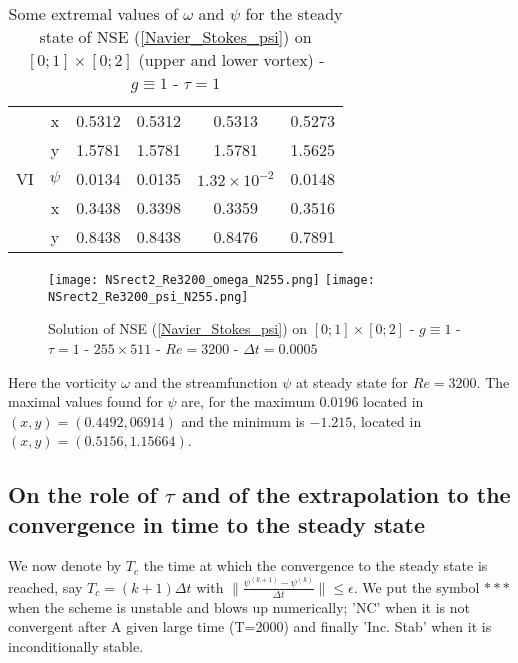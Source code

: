 \documentclass[11pt]{article}
\newcommand{\Frac}[2] {\frac{\textstyle #1} {\textstyle #2}}
\begin{document}
{\begin{table}[!h]
\begin{center}
\begin{tabular}{|  c|c|c|c|c|c | }
                & x           & 0.5312           &  0.5312          & 0.5313                & 0.5273\\ 

                & y           & 1.5781           &  1.5781          & 1.5781                & 1.5625\\ 
\hline 
VI              & $\psi$      & 0.0134           &  0.0135          & $1.32 \times 10^{-2}$ & 0.0148\\ 

                & x           & 0.3438           &  0.3398          & 0.3359                & 0.3516\\ 
                
                & y           & 0.8438           &  0.8438          & 0.8476                & 0.7891\\ 
\hline
\end{tabular} 




\caption{Some extremal values of $\omega$ and $\psi$ for the steady state of NSE (\ref{Navier_Stokes_psi}) on $[0; 1] \times [0; 2]$ (upper and lower vortex) - $g \equiv 1$ - $\tau = 1$}
\label{Vortex_rect}
\end{center}
\end{table}
\clearpage

\begin{figure}[!h]
\begin{center}
\texttt{[image: NSrect2\_Re3200\_omega\_N255.png]}
\texttt{[image: NSrect2\_Re3200\_psi\_N255.png]}\\
\caption{Solution of NSE (\ref{Navier_Stokes_psi}) on $[0; 1] \times [0; 2]$ - $g \equiv 1$ - $\tau = 1$ -  $255 \times 511$ - $Re = 3200$ - $\Delta t = 0.0005$}
\label{NSrect_Re3200}
\end{center}
\end{figure}
Here the vorticity $\omega$ and the streamfunction $\psi$ at steady state for $Re=3200$. The maximal values found 
for $\psi$ are, for the maximum $0.0196$ located in $(x,y)=(0.4492,06914)$ and the minimum is $-1.215$, located in
$(x,y)=(0.5156,1.15664)$.
\subsection{On the role of $\tau$ and of the extrapolation to the convergence in time to the steady state}
We now denote by $T_c$ the time at which the convergence to the steady state is reached, say $T_c=(k+1)\Delta t$ with
$\displaystyle{ \parallel \Frac{\psi^{(k+1)}-\psi^{(k)} }{\Delta t}\parallel } \le \epsilon$. We put the symbol $***$ when the scheme is unstable and blows up numerically; 'NC' when it is not convergent after A given large time (T=2000) and finally 'Inc. Stab' when it is inconditionally stable.\\

}
\end{document}
